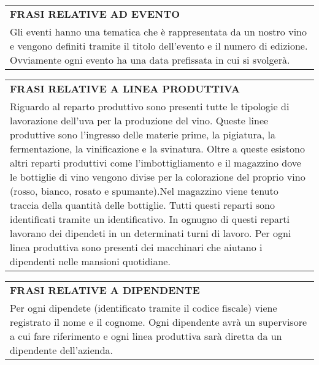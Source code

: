 \begin{center}
	\vspace{0.5cm}
	
	\begin{tabular}{P{16cm}}
		\toprule
		 \textbf {\large {FRASI RELATIVE AD EVENTO}} \\
		Gli eventi hanno una tematica che è rappresentata da un nostro vino e vengono definiti tramite il titolo dell'evento e il numero di edizione. Ovviamente ogni evento ha una data prefissata in cui si svolgerà.\\
		\bottomrule
	\end{tabular}
	
	\vspace{0.5cm}
		
	\begin{tabular}{P{16cm}}
		\toprule
		 \textbf {\large {FRASI RELATIVE A LINEA PRODUTTIVA}} \\
		Riguardo al reparto produttivo sono presenti tutte le tipologie di lavorazione dell'uva per la produzione del vino. Queste linee produttive sono l'ingresso delle materie prime, la pigiatura, la fermentazione, la vinificazione e la svinatura. Oltre a queste esistono altri reparti produttivi come l'imbottigliamento e il magazzino dove le bottiglie di vino vengono divise per la colorazione del proprio vino (rosso, bianco, rosato e spumante).Nel magazzino viene tenuto traccia della quantità delle bottiglie. Tutti questi reparti sono identificati tramite un identificativo. In ognugno di questi reparti lavorano dei dipendeti in un determinati turni di lavoro. Per ogni linea produttiva sono presenti dei macchinari che aiutano i dipendenti nelle mansioni quotidiane.\\
		\bottomrule
	\end{tabular}
	
	\vspace{0.5cm}
	
	\begin{tabular}{P{16cm}}
		\toprule
		 \textbf {\large {FRASI RELATIVE A DIPENDENTE}} \\
		Per ogni dipendete (identificato tramite il codice fiscale) viene registrato il nome e il cognome. Ogni dipendente avrà un supervisore a cui fare riferimento e ogni linea produttiva sarà diretta da un dipendente dell'azienda.\\
		\bottomrule
	\end{tabular}
	
	\vspace{0.5cm}
	

\end{center}
